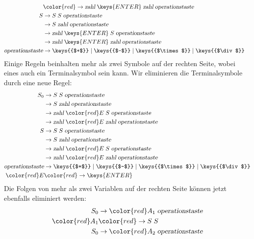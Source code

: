 \begin{loesung}
\begin{teilaufgaben}
\begin{align*}
\\
 &\color{red}\rightarrow \textsl{zahl}\;\keys{ENTER}\; \textsl{zahl}\;\textsl{operationstaste}
\\
S&\rightarrow S \; S \; \textsl{operationstaste}
\\
 &\rightarrow S \; \textsl{zahl} \; \textsl{operationstaste}
\\
 &\rightarrow \textsl{zahl}\;\keys{ENTER}\; S\;\textsl{operationstaste}
\\
 &\rightarrow \textsl{zahl}\;\keys{ENTER}\; \textsl{zahl}\;\textsl{operationstaste}
\\
\textsl{operationstaste}&\rightarrow
\keys{{$+$}}
\;|\;
\keys{{$-$}}
\;|\;
\keys{{$\times$}}
\;|\;
\keys{{$\div$}}
\end{align*}
Einige Regeln beinhalten mehr als zwei Symbole auf der rechten Seite, 
wobei eines auch ein Terminalsymbol sein kann. Wir eliminieren die
Terminalsymbole durch eine neue Regel:
\begin{align*}
S_0&\rightarrow S \; S \; \textsl{operationstaste}
\\
 &\rightarrow S \; \textsl{zahl} \; \textsl{operationstaste}
\\
 &\rightarrow \textsl{zahl}\; {\color{red}E} \; S\;\textsl{operationstaste}
\\
 &\rightarrow \textsl{zahl}\; {\color{red}E} \; \textsl{zahl}\;\textsl{operationstaste}
\\
S&\rightarrow S \; S \; \textsl{operationstaste}
\\
 &\rightarrow S \; \textsl{zahl} \; \textsl{operationstaste}
\\
 &\rightarrow \textsl{zahl} \; {\color{red}E} \; S\;\textsl{operationstaste}
\\
 &\rightarrow \textsl{zahl}\; {\color{red}E} \; \textsl{zahl}\;\textsl{operationstaste}
\\
\textsl{operationstaste}&\rightarrow
\keys{{$+$}}
\;|\;
\keys{{$-$}}
\;|\;
\keys{{$\times$}}
\;|\;
\keys{{$\div$}}
\\
\color{red}E&\color{red}\rightarrow\keys{ENTER}
\end{align*}
Die Folgen von mehr als zwei Variablen auf der rechten Seite können jetzt
ebenfalls eliminiert werden:
\begin{align*}
S_0&\rightarrow {\color{red}A_1} \; \textsl{operationstaste}
\\
\color{red}A_1&\color{red}\rightarrow S \; S 
\\
S_0&\rightarrow {\color{red}A_2} \; \textsl{operationstaste}
\\

\end{align*}
\end{teilaufgaben}
\end{loesung}
